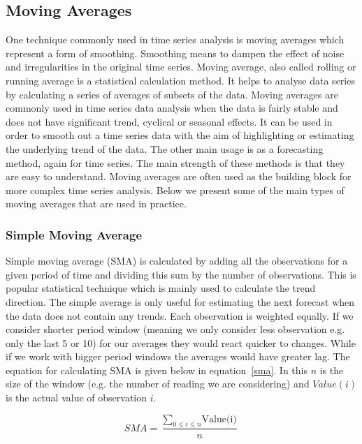 \subsection{Moving Averages}
One technique commonly used in time series analysis is moving averages which represent a form of smoothing. Smoothing means to dampen the effect of noise and irregularities in the original time series. Moving average, also called rolling or running average is a statistical calculation method. It helps to analyse data series by calculating a series of averages of subsets of the data. Moving averages are commonly used in time series data analysis when the data is fairly stable and does not have significant trend, cyclical or seasonal effects. It can be used in order to smooth out a time series data with the aim of highlighting or estimating the underlying trend of the data. The other main usage is as a forecasting method, again for time series. The main strength of these methods is that they are easy to understand. Moving averages are often used as the building block for more complex time series analysis. Below we present some of the main types of moving averages that are used in practice. \cite{brockwell2009time,shumway2010time}

\subsubsection{Simple Moving Average}
Simple moving average (SMA) is calculated by adding all the observations for a given period of time and dividing this sum by the number of observations. This is popular statistical technique which is mainly used to calculate the trend direction. The simple average is only useful for estimating the next forecast when the data does not contain any trends. Each observation is weighted equally. If we consider shorter period window (meaning we only consider less observation e.g. only the last 5 or 10) for our averages they would react quicker to changes. While if we work with bigger period windows the averages would have greater lag. The equation for calculating SMA is given below in equation~\ref{sma}. In this $n$ is the size of the window (e.g. the number of reading we are considering) and $Value(i)$ is the actual value of observation $i$. 

\begin{equation}\label{sma}
	SMA = \frac{\sum_{0\le i\le n}\textrm{Value(i)}}{n}
\end{equation}

